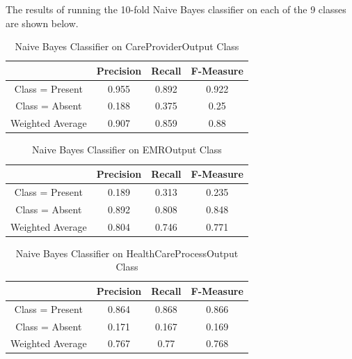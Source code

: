 \documentclass[11pt, notitlepage,abstracton,oneside]{article}   	%
\begin{document}
The results of running the 10-fold Naive Bayes classifier on each of the 9 classes are shown below.

\begin{table}[htdp]
\caption{Naive Bayes Classifier on CareProviderOutput Class}
\begin{center}
\begin{tabular}{|c|c|c|c|}
\hline
& Precision & Recall & F-Measure \\ \hline
Class = Present & 0.955 & 0.892 & 0.922 \\ \hline
Class = Absent & 0.188 & 0.375 & 0.25 \\ \hline
Weighted Average & 0.907 & 0.859 & 0.88 \\ \hline
\end{tabular}
\end{center}
\label{default}
\end{table}%

\begin{table}[htdp]
\caption{Naive Bayes Classifier on EMROutput Class}
\begin{center}
\begin{tabular}{|c|c|c|c|}
\hline
& Precision & Recall & F-Measure \\ \hline
Class = Present & 0.189 & 0.313 & 0.235 \\ \hline
Class = Absent & 0.892 & 0.808 & 0.848 \\ \hline
Weighted Average & 0.804 & 0.746 & 0.771\\ \hline
\end{tabular}
\end{center}
\label{default}
\end{table}%

\begin{table}[htdp]
\caption{Naive Bayes Classifier on HealthCareProcessOutput Class}
\begin{center}
\begin{tabular}{|c|c|c|c|}
\hline
& Precision & Recall & F-Measure \\ \hline
Class = Present & 0.864 & 0.868 & 0.866 \\ \hline
Class = Absent & 0.171 & 0.167 & 0.169 \\ \hline
Weighted Average & 0.767 & 0.77 & 0.768 \\ \hline
\end{tabular}
\end{center}
\label{default}
\end{table}%
\end{document}

